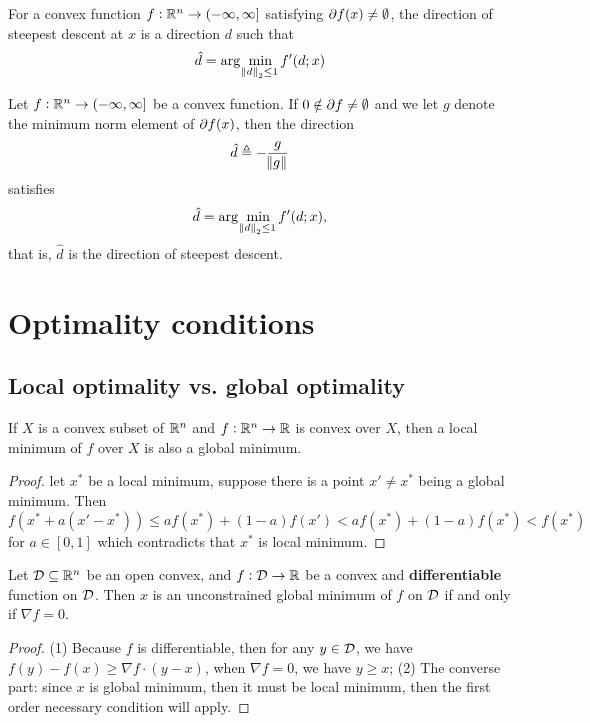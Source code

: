 \begin{refsection}
\begin{remark}[interpretation]
\end{remark}



\begin{definition}
	For a convex function $f:\mathbb{R}^n\to (-\infty,\infty]$ satisfying $\partial f(x) \neq \emptyset$, the direction of steepest descent at $x$ is a direction $d$ such that
	$$\hat{d} = \arg\min_{\norm{d}_2 \leq 1} f'(d;x)$$
	
\end{definition}

\begin{lemma}
	Let $f:\mathbb{R}^n\to (-\infty,\infty]$ be a convex function. If $0\notin \partial f\neq \emptyset$ and we let $g$ denote the minimum norm element of $\partial f(x)$, then the direction 
	$$\hat{d} \triangleq -\frac{g}{\norm{g}}$$
	satisfies
	$$\hat{d} = \arg\min_{\norm{d}_2\leq 1} f'(d;x),$$
	that is, $\hat{d}$ is the direction of steepest descent.
\end{lemma}





\section{Optimality conditions}\label{ch:convex-optimization:sec:optimality-conditions}
\subsection{Local optimality vs. global optimality}


\begin{lemma}
If $X$ is a convex subset of $\mathbb{R}^n$ and $f:\mathbb{R}^n\to \mathbb{R}$ is convex over $X$, then a local minimum of $f$ over $X$ is also a global minimum. 
\end{lemma}
\begin{proof}
let $x^*$ be a local minimum, suppose there is a point $x' \neq x^*$ being a global minimum. Then
$$f(x^* + a(x'-x^*)) \leq a f(x^*) + (1-a) f(x') < af(x^*) + (1-a)f(x^*) <f(x^*)$$
for $a\in [0,1]$ which contradicts that $x^*$ is local minimum.
\end{proof}





\begin{lemma}
\cite[187]{sundaram1996first}
Let $\mathcal{D}\subseteq \mathbb{R}^n$ be an open convex, and $f: \mathcal{D}\to \mathbb{R}$ be a convex and \textbf{differentiable} function on $\mathcal{D}$. Then $x$ is an unconstrained global minimum of $f$ on $\mathcal{D}$ if and only if $\nabla f = 0$.
\end{lemma}
\begin{proof}
(1) Because $f$ is differentiable, then for any $y\in \mathcal{D}$, we have $f(y)-f(x) \geq \nabla f \cdot (y-x)$, when $\nabla f=0$, we have $y\geq x$; (2) The converse part: since $x$ is global minimum, then it must be local minimum, then the first order necessary condition will apply.
\end{proof}



\end{refsection}
